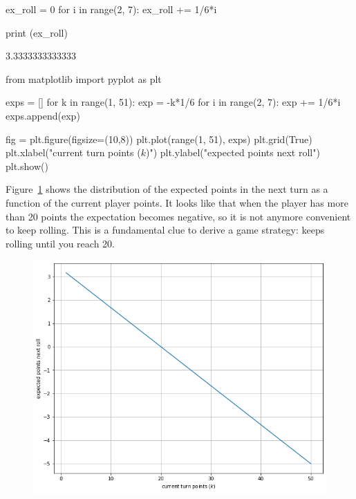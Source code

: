 \cprotEnv\begin{solution}
\begin{ipython}
ex_roll = 0
for i in range(2, 7):
    ex_roll += 1/6*i

print (ex_roll)
\end{ipython}
\begin{ioutput}
3.3333333333333
\end{ioutput}

\begin{ipython}
from matplotlib import pyplot as plt

exps = []
for k in range(1, 51):
    exp = -k*1/6
    for i in range(2, 7):
        exp += 1/6*i
    exps.append(exp)

fig = plt.figure(figsize=(10,8))
plt.plot(range(1, 51), exps)
plt.grid(True)
plt.xlabel("current turn points ($k$)")
plt.ylabel("expected points next roll")
plt.show()
\end{ipython}

Figure~\ref{fig:greedy_pig_expec} shows the distribution of the expected points in the next turn as a function of the current player points. It looks like that when the player has more than 20 points the expectation becomes negative, so it is not anymore convenient to keep rolling. This is a fundamental clue to derive a game strategy: keeps rolling until you reach 20.

\begin{figure}[htbp]
	\begin{center}
		\includegraphics[width=0.7\linewidth]{figures/greedy_pig_expectation}
	\end{center}
\label{fig:greedy_pig_expec}
\end{figure}
\end{solution}
